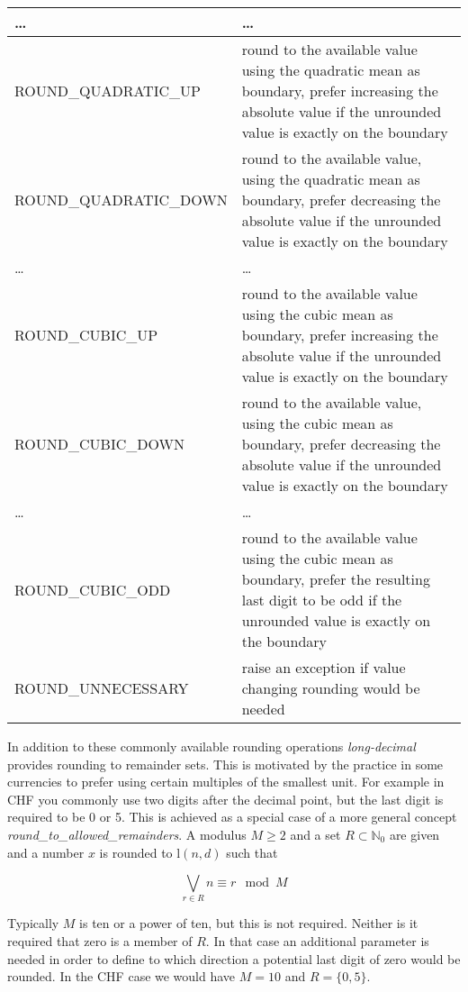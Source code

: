 \documentclass[10pt,a4paper]{article}
\def\ld{\mathrm l}
\begin{document}
\begin{tabular}{|l|p{100mm}|}
\hline
  \dots & \ldots\\
\hline
  ROUND\_QUADRATIC\_UP      & round to the available value using the quadratic mean as boundary, prefer increasing the absolute value if the unrounded value is exactly on the boundary\\
\hline
  ROUND\_QUADRATIC\_DOWN    & round to the available value, using the quadratic mean as boundary, prefer decreasing the absolute value if the unrounded value is exactly on the boundary\\
\hline
  \dots & \ldots\\
\hline
  ROUND\_CUBIC\_UP      & round to the available value using the cubic mean as boundary, prefer increasing the absolute value if the unrounded value is exactly on the boundary\\
\hline
  ROUND\_CUBIC\_DOWN    & round to the available value, using the cubic mean as boundary, prefer decreasing the absolute value if the unrounded value is exactly on the boundary\\
\hline
  \dots & \ldots\\
\hline
  ROUND\_CUBIC\_ODD    & round to the available value using the cubic mean as boundary, prefer the resulting last digit to be odd if the unrounded value is exactly on the boundary\\
\hline
  ROUND\_UNNECESSARY  & raise an exception if value changing rounding would be needed\\
\hline
\end{tabular}


In addition to these commonly available rounding operations {\slshape long-decimal\/} provides rounding to remainder sets.  This is motivated by the practice in some
currencies to prefer using certain multiples of the smallest unit.  For example in CHF you commonly use two digits after the decimal point, but the last digit is
required to be 0 or 5.  This is achieved as a special case of a more general concept {\slshape round\_to\_allowed\_remainders\/}.  A modulus $M \ge 2$ and a set
$R\subset\mathbb{N}_0$ are given and a number $x$ is rounded to $\ld(n, d)$ such that

$$\bigvee_{r\in R} n \equiv r \mod M$$

Typically $M$ is ten or a power of ten, but this is not required.  Neither is it required that zero is a member of $R$.  In that case an additional parameter is needed
in order to define to which direction a potential last digit of zero would be rounded.  In the CHF case we would have $M=10$ and $R=\{0, 5\}$.
\end{document}
